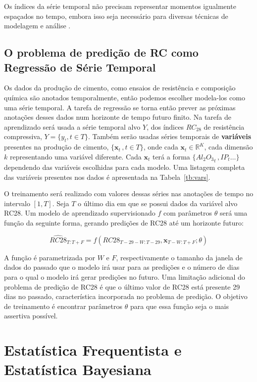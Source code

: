 Os índices da série temporal não precisam representar momentos igualmente
espaçados no tempo, embora isso seja necessário para diversas técnicas de
modelagem e análise \citep{ARIMA_LSTM}.


\subsection{O problema de predição de RC como Regressão de Série Temporal}


Os dados da produção de cimento, como ensaios de resistência e composição química são anotados temporalmente, então podemos escolher
modela-los como uma série temporal. A tarefa de regressão se torna então prever as próximas anotações desses
dados num horizonte de tempo futuro finito.
Na tarefa de aprendizado será usada a série temporal alvo $Y$, dos índices
$RC_{28}$ de resistência compressiva, $Y = \{y_t , t \in T \}$.
Também serão usadas séries temporais de
\textbf{variáveis} presentes na produção de cimento, $\{ \textbf{x}_t  \, , t
\in T  \}$, onde cada $\textbf{x}_t \in \mathbb{R}^K$, cada dimensão $k$
representando uma variável diferente. Cada $\textbf{x}_t$ terá a forma
$\{{Al_2O_3}_t\, , IP_t \dots \}$ dependendo das variáveis escolhidas para cada
modelo. Uma listagem completa das variáveis presentes nos dados é apresentada na
Tabela~\ref{tb:vars}.

O treinamento será realizado com valores dessas séries nas anotações de tempo no
intervalo $[1,T]$.
Seja $T$ o último dia em que se possui dados da variável alvo RC28.
Um modelo de aprendizado supervisionado $f$ com parâmetros $\theta$ será
uma função da seguinte forma, gerando predições de RC28 até um horizonte futuro:


\[
  \hat{RC28}_{T:T+F}  = f ( RC28_{T-29-W:T-29},\textbf{x}_{T-W:T+F} ; \theta)
\]

A função é parametrizada por $W$ e $F$, respectivamente o tamanho da janela de
dados do passado que o modelo irá usar para as predições e o número de dias para
o qual o modelo irá gerar predições no futuro. Uma limitação adicional do problema de predição de RC28 é que
o último valor de RC28 está presente 29 dias no passado, característica
incorporada no problema de predição. 
O objetivo de treinamento é encontrar parâmetros $\theta$ para que essa função seja o mais assertiva possível.


\section{Estatística Frequentista e Estatística Bayesiana}
 
